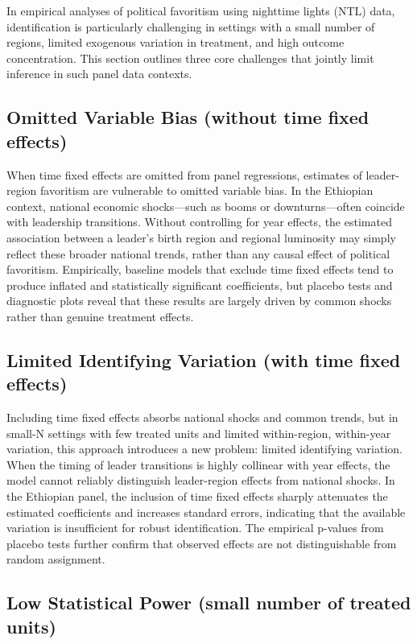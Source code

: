 \documentclass[12pt,a4paper]{article}
\begin{document}
In empirical analyses of political favoritism using nighttime lights (NTL) data, identification is particularly challenging in settings with a small number of regions, limited exogenous variation in treatment, and high outcome concentration. This section outlines three core challenges that jointly limit inference in such panel data contexts.

\subsection{Omitted Variable Bias (without time fixed effects)}

When time fixed effects are omitted from panel regressions, estimates of leader-region favoritism are vulnerable to omitted variable bias. In the Ethiopian context, national economic shocks—such as booms or downturns—often coincide with leadership transitions. Without controlling for year effects, the estimated association between a leader’s birth region and regional luminosity may simply reflect these broader national trends, rather than any causal effect of political favoritism. Empirically, baseline models that exclude time fixed effects tend to produce inflated and statistically significant coefficients, but placebo tests and diagnostic plots reveal that these results are largely driven by common shocks rather than genuine treatment effects.

\subsection{Limited Identifying Variation (with time fixed effects)}

Including time fixed effects absorbs national shocks and common trends, but in small-N settings with few treated units and limited within-region, within-year variation, this approach introduces a new problem: limited identifying variation. When the timing of leader transitions is highly collinear with year effects, the model cannot reliably distinguish leader-region effects from national shocks. In the Ethiopian panel, the inclusion of time fixed effects sharply attenuates the estimated coefficients and increases standard errors, indicating that the available variation is insufficient for robust identification. The empirical p-values from placebo tests further confirm that observed effects are not distinguishable from random assignment.

\subsection{Low Statistical Power (small number of treated units)}
\end{document}
